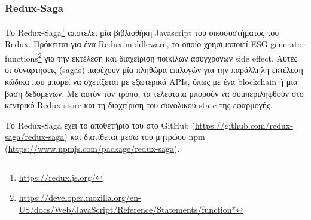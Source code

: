 \subsubsection{Redux-Saga} \label{subsection:4-3-2-3-redux-saga}


Το Redux-Saga\footnote{\url{https://redux.js.org/}} αποτελεί μία βιβλιοθήκη Javascript του οικοσυστήματος του Redux. Πρόκειται για ένα Redux middleware, το οποίο χρησιμοποιεί ESG generator functions\footnote{\url{https://developer.mozilla.org/en-US/docs/Web/JavaScript/Reference/Statements/function*}} για την εκτέλεση και διαχείριση ποικίλων ασύγχρονων side effect. Αυτές οι συναρτήσεις (sagas) παρέχουν μία πληθώρα επιλογών για την παράλληλη εκτέλεση κώδικα που μπορεί να σχετίζεται με εξωτερικά APIs, όπως με ένα blockchain ή μία βάση δεδομένων. Με αυτόν τον τρόπο, τα τελευταία μπορούν να συμπεριληφθούν στο κεντρικό Redux store και τη διαχείριση του συνολικού state της εφαρμογής.

Το Redux-Saga έχει το αποθετήριό του στο GitHub (\url{https://github.com/redux-saga/redux-saga}) και διατίθεται μέσω του μητρώου npm (\url{https://www.npmjs.com/package/redux-saga}).
